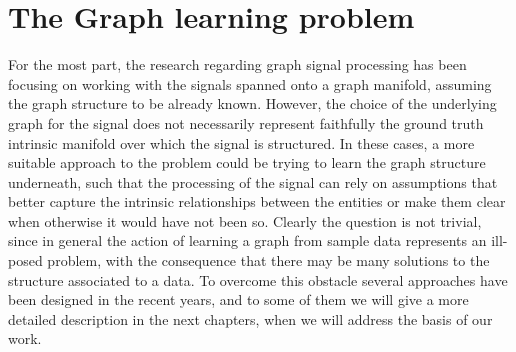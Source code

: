 \section{The Graph learning problem}
For the most part, the research regarding graph signal processing has been focusing on working with the signals spanned onto a graph manifold, assuming the graph structure to be already known. However, the choice of the underlying graph for the signal does not necessarily represent faithfully the ground truth intrinsic manifold over which the signal is structured. In these cases, a more suitable approach to the problem could be trying to learn the graph structure underneath, such that the processing of the signal can rely on assumptions that better capture the intrinsic relationships between the entities or make them clear when otherwise it would have not been so.\cite{Maretic2017} Clearly the question is not trivial, since in general the action of learning a graph from sample data represents an ill-posed problem, with the consequence that there may be many solutions to the structure associated to a data. \cite{Dong2016} To overcome this obstacle several approaches have been designed in the recent years, and to some of them we will give a more detailed description in the next chapters, when we will address the basis of our work.
